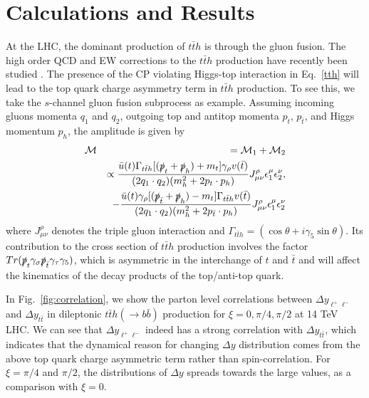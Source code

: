 \documentclass[twocolumn,prd,noshowpacs,nofootinbib,amsmath,amssymb,superscriptaddress,preprintnumbers]{revtex4}
\begin{document}
\section{Calculations and Results}
At the LHC, the dominant production of $t\bar{t}h$ is through the gluon fusion. The high order QCD and EW corrections to the $t\bar{t}h$ production have recently been studied  \cite{Dawson:1998py,Frederix:2011zi,Yu:2014cka,Demartin:2014fia,Frixione:2014qaa,Frixione:2015zaa,Maltoni:2016yxb,Broggio:2016lfj}. The presence of the CP violating Higgs-top interaction in Eq.~\ref{tth} will lead to the top quark charge asymmetry term in $t\bar{t}h$ production. To see this, we take the $s$-channel gluon fusion subprocess as example. Assuming incoming gluons momenta $q_1$ and $q_2$, outgoing top and antitop momenta $p_t$, $p_{\bar{t}}$, and Higgs momentum $p_h$, the amplitude is given by
\begin{eqnarray}
{\cal M}&&={\cal M}_1+{\cal M}_2 \nonumber\\
 && \propto \frac{\bar{u} (t)\Gamma_{t\bar{t}h}[(\slashed p_{t}+\slashed p_h)+m_t]\gamma_{\rho}v(\bar{t})}{(2q_1\cdot q_2)(m^2_h+2p_t\cdot p_h)}J^{\rho}_{\mu\nu}\epsilon^{\mu}_{1}\epsilon^{\nu}_{2},\nonumber\\
 &&-\frac{\bar{u}(t)\gamma_{\rho}[(\slashed p_{\bar{t}}+\slashed p_h)-m_t]\Gamma_{t\bar{t}h}v(\bar{t})}{(2q_1\cdot q_2)(m^2_h+2p_{\bar{t}}\cdot p_h)}J^{\rho}_{\mu\nu}\epsilon^{\mu}_{1}\epsilon^{\nu}_{2}
\end{eqnarray}
where $J^\rho_{\mu\nu}$ denotes the triple gluon interaction and $\Gamma_{t\bar{t}h}=(\cos\theta+i\gamma_{5}\sin\theta)$. Its contribution to the cross section of $t\bar{t}h$ production involves the factor $Tr(\slashed p_t \gamma_\sigma \slashed p_{\bar{t}} \gamma_\tau \gamma_5)$, which is asymmetric in the interchange of $t$ and $\bar{t}$ and will affect the kinematics of the decay products of the top/anti-top quark.

In Fig.~\ref{fig:correlation}, we show the parton level correlations between $\Delta y_{\ell^+\ell^-}$ and $\Delta y_{t\bar{t}}$ in dileptonic $t\bar{t}h(\to b\bar{b})$ production for $\xi=0,\pi/4,\pi/2$ at 14 TeV LHC. We can see that $\Delta y_{\ell^+\ell^-}$ indeed has a strong correlation with $\Delta y_{t\bar{t}}$, which indicates that the dynamical reason for changing $\Delta y$ distribution comes from the above top quark charge asymmetric term rather than spin-correlation. For $\xi=\pi/4$ and $\pi/2$, the distributions of $\Delta y$ spreads towards the large values, as a comparison with $\xi=0$.
\end{document}
